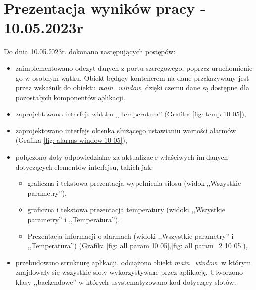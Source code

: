 \section{Prezentacja wyników pracy - 10.05.2023r}
    Do dnia 10.05.2023r. dokonano następujących postępów:
        \begin{itemize}
            \item zaimplementowano odczyt danych z portu szeregowego, poprzez uruchomienie go w osobnym wątku. 
                Obiekt będący kontenerem na dane przekazywany jest przez wskaźnik do obiektu \textit{main\_window}, dzięki
                czemu dane są dostępne dla pozostałych komponentów aplikacji.
            \item zaprojektowano interfejs widoku ,,Temperatura'' (Grafika \ref{fig: temp 10 05}),
            \item zaprojektowano interfejs okienka służącego ustawianiu wartości alarmów (Grafika \ref{fig: alarms window 10 05}),
            \item połączono sloty odpowiedzialne za aktualizacje właściwych im danych dotyczących elementów interfejsu, takich jak:
                \begin{itemize}
                    \item graficzna i tekstowa  prezentacja wypełnienia silosu (widok ,,Wszystkie parametry''),
                    \item graficzna i tekstowa prezentacja temperatury (widoki ,,Wszystkie parametry'' i ,,Temperatura''),
                    \item Prezentacja informacji o alarmach  (widoki ,,Wszystkie parametry'' i ,,Temperatura'') (Grafika \ref{fig: all param 10 05},\ref{fig: all param_2 10 05}),
                \end{itemize}
            \item przebudowano strukturę aplikacji, odciążono obiekt \textit{main\_window}, w którym znajdowały się 
                wszystkie sloty wykorzystywane przez aplikację. Utworzono klasy ,,backendowe'' w których usystematyzowano
                kod dotyczący  slotów.
        \end{itemize}

